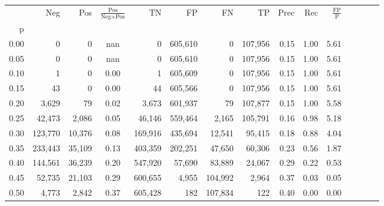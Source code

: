 \begin{tabular}{rrrcrrrrrrrrrrr}
\toprule
{} &      Neg &     Pos & $\frac{\text{Pos}}{\text{Neg}+\text{Pos}}$ &       TN &       FP &       FN &       TP &  Prec &   Rec & $\frac{\text{FP}}{\text{P}}$ \\
p    &          &         &                                            &          &          &          &          &       &       &                              \\
\midrule
0.00 &        0 &       0 &                                        nan &        0 &  605,610 &        0 &  107,956 &  0.15 &  1.00 &                         5.61 \\
0.05 &        0 &       0 &                                        nan &        0 &  605,610 &        0 &  107,956 &  0.15 &  1.00 &                         5.61 \\
0.10 &        1 &       0 &                                       0.00 &        1 &  605,609 &        0 &  107,956 &  0.15 &  1.00 &                         5.61 \\
0.15 &       43 &       0 &                                       0.00 &       44 &  605,566 &        0 &  107,956 &  0.15 &  1.00 &                         5.61 \\
0.20 &    3,629 &      79 &                                       0.02 &    3,673 &  601,937 &       79 &  107,877 &  0.15 &  1.00 &                         5.58 \\
0.25 &   42,473 &   2,086 &                                       0.05 &   46,146 &  559,464 &    2,165 &  105,791 &  0.16 &  0.98 &                         5.18 \\
0.30 &  123,770 &  10,376 &                                       0.08 &  169,916 &  435,694 &   12,541 &   95,415 &  0.18 &  0.88 &                         4.04 \\
0.35 &  233,443 &  35,109 &                                       0.13 &  403,359 &  202,251 &   47,650 &   60,306 &  0.23 &  0.56 &                         1.87 \\
0.40 &  144,561 &  36,239 &                                       0.20 &  547,920 &   57,690 &   83,889 &   24,067 &  0.29 &  0.22 &                         0.53 \\
0.45 &   52,735 &  21,103 &                                       0.29 &  600,655 &    4,955 &  104,992 &    2,964 &  0.37 &  0.03 &                         0.05 \\
0.50 &    4,773 &   2,842 &                                       0.37 &  605,428 &      182 &  107,834 &      122 &  0.40 &  0.00 &                         0.00 \\

\end{tabular}
